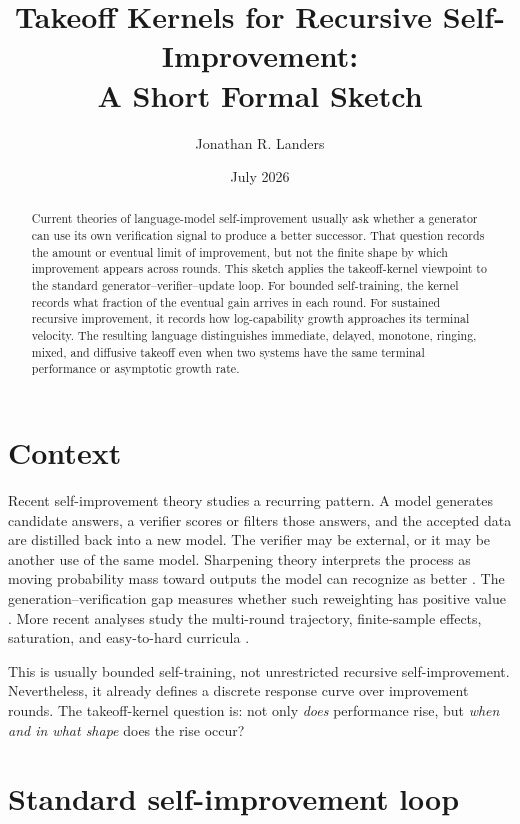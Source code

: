 \documentclass[10pt,twocolumn]{article}
\title{\vspace{-1.2em}Takeoff Kernels for Recursive Self-Improvement:\\
A Short Formal Sketch}
\author{Jonathan R. Landers}
\date{July 2026}
\begin{document}
\maketitle
\vspace{-1.5em}

\begin{abstract}
Current theories of language-model self-improvement usually ask whether a
generator can use its own verification signal to produce a better successor.
That question records the amount or eventual limit of improvement, but not the
finite shape by which improvement appears across rounds.  This sketch applies
the takeoff-kernel viewpoint to the standard generator--verifier--update loop.
For bounded self-training, the kernel records what fraction of the eventual
gain arrives in each round.  For sustained recursive improvement, it records
how log-capability growth approaches its terminal velocity.  The resulting
language distinguishes immediate, delayed, monotone, ringing, mixed, and
diffusive takeoff even when two systems have the same terminal performance or
asymptotic growth rate.
\end{abstract}

\section{Context}

Recent self-improvement theory studies a recurring pattern.  A model generates
candidate answers, a verifier scores or filters those answers, and the accepted
data are distilled back into a new model.  The verifier may be external, or it
may be another use of the same model.  Sharpening theory interprets the process
as moving probability mass toward outputs the model can recognize as better
\cite{huang2025}.  The generation--verification gap measures whether such
reweighting has positive value \cite{song2025}.  More recent analyses study the
multi-round trajectory, finite-sample effects, saturation, and easy-to-hard
curricula \cite{sun2026,liu2026}.

This is usually bounded self-training, not unrestricted recursive
self-improvement.  Nevertheless, it already defines a discrete response curve
over improvement rounds.  The takeoff-kernel question is: not only \emph{does}
performance rise, but \emph{when and in what shape} does the rise occur?

\section{Standard self-improvement loop}
\end{document}
